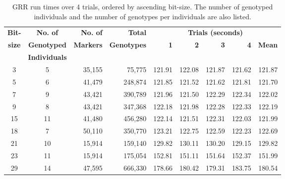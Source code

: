 \begin{table}[h]
\begin{center}
\begin{tabular}{ccrrrrrrr} \toprule
\textbf{Bit-} & \textbf{No. of}     &  \textbf{No. of}  & \textbf{Total}      & \multicolumn{5}{c}{\textbf{Trials (seconds)}}              \\
\textbf{size} & \textbf{Genotyped} & \textbf{Markers} & \textbf{Genotypes} & \textbf{1}&\textbf{2}&\textbf{3}&\textbf{4}& \textbf{Mean}\\
              & \textbf{Individuals}                  &               &                  &         &       &        &        &        \\
\midrule
3        & 5                            & 35,155         & 75,775          & 121.91 & 122.08 & 121.87 & 121.62 & 121.87 \\
5        & 6                            & 41,479         & 248,874         & 121.85 & 121.52 & 121.62 & 121.81 & 121.70 \\
7        & 9                            & 43,421         & 390,789         & 121.96 & 121.50 & 122.29 & 122.34 & 122.02 \\
9        & 8                            & 43,421         & 347,368         & 122.18 & 121.98 & 122.28 & 122.33 & 122.19 \\
15       & 11                           & 41,480         & 456,280         & 122.14 & 121.51 & 122.31 & 122.03 & 121.99 \\
18       & 7                            & 50,110         & 350,770         & 123.21 & 122.75 & 122.59 & 122.23 & 122.69 \\
21       & 10                           & 15,914         & 159,140         & 129.82 & 130.11 & 130.20 & 129.15 & 129.82 \\
23       & 11                           & 15,914         & 175,054         & 152.81 & 151.11 & 151.64 & 152.37 & 151.99 \\
29       & 14                           & 47,595         & 666,330         & 178.66 & 180.42 & 179.31 & 183.75 & 180.54 \\
\hline
\end{tabular}
\end{center}
\vspace{-15pt}
\caption[GRR run times, 4 trials, ascending bit-size]{GRR run times over 4 trials, ordered by ascending bit-size. The number of genotyped individuals and the number of genotypes per individuals are also listed.}\label{table:res:grrtimes}
\end{table}

